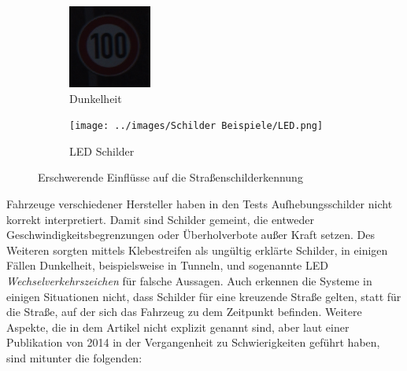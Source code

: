 \begin{figure}[H]
\begin{subfigure}[b]{0.125\textwidth}
       \includegraphics[height=\textwidth]{../images/Schilder Beispiele/Dunkelheit.png}
       \caption{Dunkelheit}
       \label{fig:dunkelheit}
   \end{subfigure}
   \hspace{3em}%
   \begin{subfigure}[b]{0.125\textwidth}
    \centering
    \texttt{[image: ../images/Schilder Beispiele/LED.png]}
    \caption{LED Schilder}
    \label{fig:ledschild}
   \end{subfigure}
      \caption{Erschwerende Einflüsse auf die Straßenschilderkennung \cite{GTSRB} \cite{led-schild}}
      \label{fig:einfluesse-strscherkennung}
\end{figure}

Fahrzeuge verschiedener Hersteller haben in den Tests Aufhebungsschilder nicht korrekt interpretiert. Damit sind Schilder gemeint, die entweder Geschwindigkeitsbegrenzungen oder Überholverbote außer Kraft setzen. Des Weiteren sorgten mittels Klebestreifen als ungültig erklärte Schilder, in einigen Fällen Dunkelheit, beispielsweise in Tunneln, und sogenannte LED \emph{Wechselverkehrszeichen} für falsche Aussagen. Auch erkennen die Systeme in einigen Situationen nicht, dass Schilder für eine kreuzende Straße gelten, statt für die Straße, auf der sich das Fahrzeug zu dem Zeitpunkt befinden. Weitere Aspekte, die in dem Artikel nicht explizit genannt sind, aber laut einer Publikation von 2014 in der Vergangenheit zu Schwierigkeiten geführt haben, sind mitunter die folgenden: \cite{traffic-sign-detection-review-2014}

